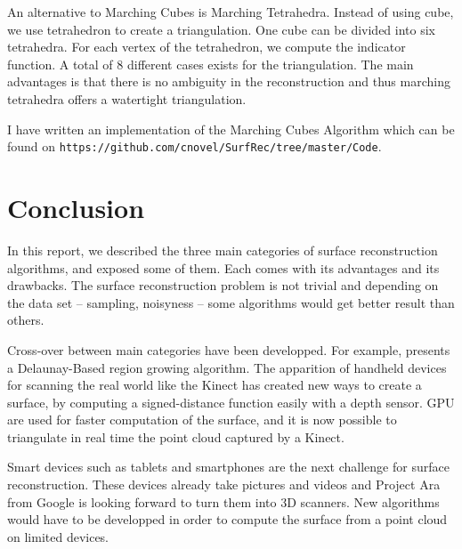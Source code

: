 \documentclass[12pt]{article}
\begin{document}
An alternative to Marching Cubes is Marching Tetrahedra. Instead of using cube, we use tetrahedron to create a triangulation. One cube can be divided into six tetrahedra. For each vertex of the tetrahedron, we compute the indicator function. A total of 8 different cases exists for the triangulation. The main advantages is that there is no ambiguity in the reconstruction and thus marching tetrahedra offers a watertight triangulation.

I have written an implementation of the Marching Cubes Algorithm which can be found on \texttt{https://github.com/cnovel/SurfRec/tree/master/Code}.

\newpage
\section*{Conclusion}

In this report, we described the three main categories of surface reconstruction algorithms, and exposed some of them. Each comes with its advantages and its drawbacks. The surface reconstruction problem is not trivial and depending on the data set -- sampling, noisyness -- some algorithms would get better result than others.

Cross-over between main categories have been developped. For example, \cite{DBRG} presents a Delaunay-Based region growing algorithm. The apparition of handheld devices for scanning the real world like the Kinect has created new ways to create a surface, by computing a signed-distance function easily with a depth sensor. GPU are used for faster computation of the surface, and it is now possible to triangulate in real time the point cloud captured by a Kinect.

Smart devices such as tablets and smartphones are the next challenge for surface reconstruction. These devices already take pictures and videos and Project Ara from Google is looking forward to turn them into 3D scanners. New algorithms would have to be developped in order to compute the surface from a point cloud on limited devices.



\newpage
{}


\end{document}
